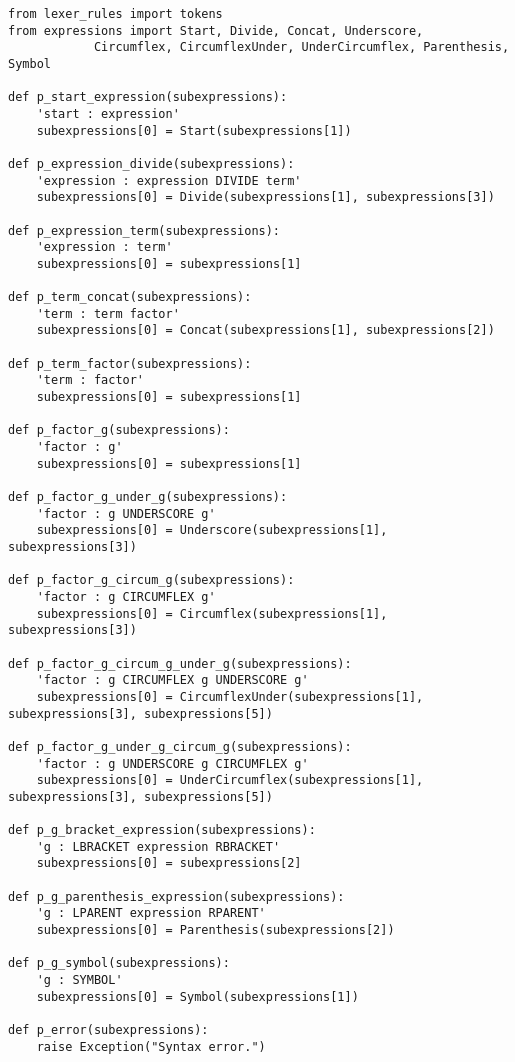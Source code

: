 \begin{verbatim}
from lexer_rules import tokens 
from expressions import Start, Divide, Concat, Underscore, 
			Circumflex, CircumflexUnder, UnderCircumflex, Parenthesis, Symbol

def p_start_expression(subexpressions):
	'start : expression'
	subexpressions[0] = Start(subexpressions[1])
	
def p_expression_divide(subexpressions):
	'expression : expression DIVIDE term'
	subexpressions[0] = Divide(subexpressions[1], subexpressions[3])

def p_expression_term(subexpressions):
	'expression : term'
	subexpressions[0] = subexpressions[1]

def p_term_concat(subexpressions):
	'term : term factor'
	subexpressions[0] = Concat(subexpressions[1], subexpressions[2])

def p_term_factor(subexpressions):
	'term : factor'
	subexpressions[0] = subexpressions[1]

def p_factor_g(subexpressions):
	'factor : g'
	subexpressions[0] = subexpressions[1]

def p_factor_g_under_g(subexpressions):
	'factor : g UNDERSCORE g'
	subexpressions[0] = Underscore(subexpressions[1], subexpressions[3])

def p_factor_g_circum_g(subexpressions):
	'factor : g CIRCUMFLEX g'
	subexpressions[0] = Circumflex(subexpressions[1], subexpressions[3])

def p_factor_g_circum_g_under_g(subexpressions):
	'factor : g CIRCUMFLEX g UNDERSCORE g'
	subexpressions[0] = CircumflexUnder(subexpressions[1], subexpressions[3], subexpressions[5])

def p_factor_g_under_g_circum_g(subexpressions):
	'factor : g UNDERSCORE g CIRCUMFLEX g'
	subexpressions[0] = UnderCircumflex(subexpressions[1], subexpressions[3], subexpressions[5])

def p_g_bracket_expression(subexpressions):
	'g : LBRACKET expression RBRACKET'
	subexpressions[0] = subexpressions[2]

def p_g_parenthesis_expression(subexpressions):
	'g : LPARENT expression RPARENT'
	subexpressions[0] = Parenthesis(subexpressions[2])	

def p_g_symbol(subexpressions):
	'g : SYMBOL'
	subexpressions[0] = Symbol(subexpressions[1])

def p_error(subexpressions):
    raise Exception("Syntax error.")
\end{verbatim}
